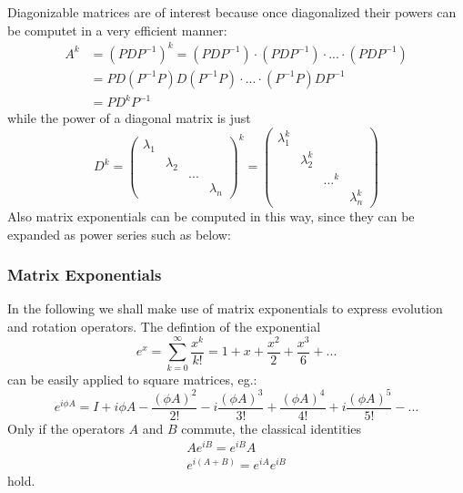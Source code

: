 \documentclass[11.5pt,a4paper]{article}
\begin{document}
Diagonizable matrices are of interest because once diagonalized their powers can be computet in a very efficient manner:
\begin{align*}
 A^k & = (P D P^{-1})^k = ( P D P^{-1}) \cdot ( P D P^{-1}) \cdot ... \cdot (P D P^{-1}) \\
    & = P D (P^{-1} P) D (P^{-1} P) \cdot ... \cdot (P^{-1} P) D P^{-1} \\
    & = P D^k P^{-1}
\end{align*}
while the power of a diagonal matrix is just
\begin{equation}
 D^k = \begin{pmatrix} 
		\lambda_1 & & & \\
		& \lambda_2 & & \\
		& & \text{...} & \\
		& & & \lambda_n
              \end{pmatrix}^k = 
	\begin{pmatrix} 
		\lambda_1^k & & & \\
		& \lambda_2^k & & \\
		& & \text{...}^k & \\
		& & & \lambda_n^k
              \end{pmatrix}
\end{equation}
Also matrix exponentials can be computed in this way, since they can be expanded as power series such as below:

\subsubsection{Matrix Exponentials}
In the following we shall make use of matrix exponentials to express evolution and rotation operators. The defintion of the exponential
\begin{equation}
 e^x = \sum_{k=0}^\infty \frac{x^k}{k!} = 1 + x + \frac{x^2}{2} + \frac{x^3}{6} + ...
\end{equation}
can be easily applied to square matrices, eg.:
\begin{equation}
 e^{i \phi A } = I + i \phi A - \frac{(\phi A)^2}{2!} - i \frac{(\phi A)^3}{3!} + \frac{(\phi A)^4}{4!} + i \frac{(\phi A)^5}{5!} - ...
\end{equation}
Only if the operators $A$ and $B$ commute, the classical identities
\begin{align}
 Ae^{iB} = e^{iB}A \\
  e^{i(A+B)} = e^{iA}e^{iB}
\end{align}
hold.
\end{document}
